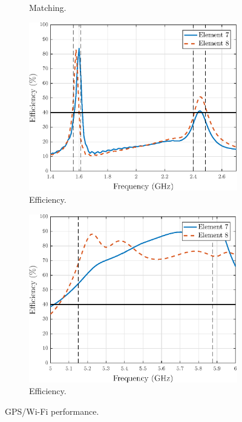 \begin{figure}[H]
\begin{subfigure}[b]{0.48\textwidth}
        \caption{Matching.}
        \label{fig:wifihi_match}
    \end{subfigure}
    
    \begin{subfigure}[b]{0.48\textwidth}
        \includegraphics[width=\textwidth]{img/wifilow_eff_wgps.eps}
        \caption{Efficiency.}
        \label{fig:wifilow_eff}
    \end{subfigure}
    \begin{subfigure}[b]{0.48\textwidth}
        \includegraphics[width=\textwidth]{img/wifihi_eff_wgps.eps}
        \caption{Efficiency.}
        \label{fig:wifihi_eff}
    \end{subfigure}
    \vspace{-7pt}
    \caption{GPS/Wi-Fi performance.}
    \label{fig:gpswifi_perf}
    \vspace{-10pt}
\end{figure}


